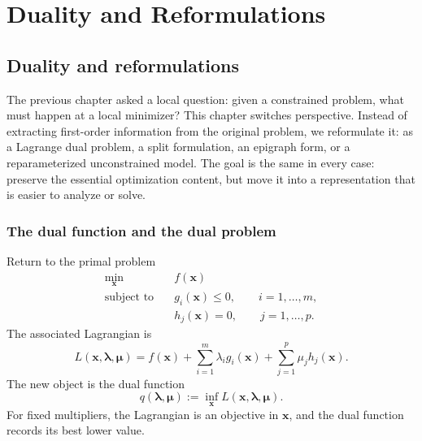 \chapter{Duality and Reformulations}

\begin{abstract}
This chapter develops the Lagrange dual function, weak and strong duality,
dual decomposition, Wasserstein duality, epigraph and reparameterization
reformulations, and the standard convex classes LP, QP, QCQP, SOCP, and SDP.
\end{abstract}

\section{Duality and reformulations}
\label{sec:ch8-transformations}
The previous chapter asked a local question: given a constrained problem, what
must happen at a local minimizer? This chapter switches perspective. Instead
of extracting first-order information from the original problem, we reformulate
it: as a Lagrange dual problem, a split formulation, an epigraph form, or a
reparameterized unconstrained model. The goal is the same in every case:
preserve the essential optimization content, but move it into a representation
that is easier to analyze or solve.

\subsection{The dual function and the dual problem}
\label{subsec:ch8-dual}
Return to the primal problem
\begin{equation}
  \label{eq:ch8-primal-dual-primal}
  \begin{aligned}
    \min_{\mathbf{x}} \quad & f(\mathbf{x}) \\
    \text{subject to}\quad & g_i(\mathbf{x}) \le 0, \qquad i=1,\dots,m, \\
    & h_j(\mathbf{x}) = 0, \qquad j=1,\dots,p.
  \end{aligned}
\end{equation}
The associated Lagrangian is
\[
  L(\mathbf{x},\boldsymbol{\lambda},\boldsymbol{\mu})
  =
  f(\mathbf{x})
  + \sum_{i=1}^m \lambda_i g_i(\mathbf{x})
  + \sum_{j=1}^p \mu_j h_j(\mathbf{x}).
\]
The new object is the dual function
\begin{equation}
  \label{eq:ch8-dual-function}
  q(\boldsymbol{\lambda},\boldsymbol{\mu})
  :=
  \inf_{\mathbf{x}} L(\mathbf{x},\boldsymbol{\lambda},\boldsymbol{\mu}).
\end{equation}
For fixed multipliers, the Lagrangian is an objective in $\mathbf{x}$, and the
dual function records its best lower value.

